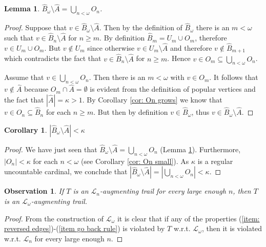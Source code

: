 \documentclass[12pt,a4paper]{amsart}
\theoremstyle{plain}
\newtheorem{corollary}[theorem]{Corollary}
\newtheorem{lemma}[theorem]{Lemma}
\newtheorem{observation}[theorem]{Observation}
\theoremstyle{definition}
\begin{document}
\begin{lemma}\label{lem: B hat minus A hat}
$ \widehat{B}_\omega\setminus \widehat{A}=\bigcup_{n<\omega}O_n $.
\end{lemma}
\begin{proof}
Suppose that $ v\in  \widehat{B}_\omega\setminus \widehat{A}$. Then by the definition of $ \widehat{B}_\omega $  there 
is an $m<\omega $ such that $ 
v \in 
\widehat{B}_n\setminus 
\widehat{A} $ for $ n\geq m $. By definition $  \widehat{B}_m= U_m\cup O_m
 $,  therefore $ v\in U_m\cup O_m $. But $ v \notin U_m $ since otherwise $ v\in U_m\setminus \widehat{A} $ and 
 therefore $ 
v\notin \widehat{B}_{m+1} $ which contradicts the fact that $ v \in 
\widehat{B}_n\setminus 
\widehat{A} $ for $ n\geq m $. Hence $ v \in O_m\subseteq  \bigcup_{n<\omega}O_n$.

Assume that $ v\in \bigcup_{n<\omega}O_n $. Then there is an $ m<\omega $ with $ v\in O_m $. It follows that $ v\notin \widehat{A} $ because 
$ O_m\cap \widehat{A}=\emptyset $ is evident from the definition of popular vertices and the fact that $ \left|\widehat{A}\right|=\kappa>1 $. By 
Corollary \ref{cor: On grows} we know that $ v\in O_n 
\subseteq 
\widehat{B}_n $ 
for each $ n \geq m $. But then by definition $ v \in \widehat{B}_{\omega} $, thus $ v\in \widehat{B}_\omega\setminus \widehat{A} $.
\end{proof}
\begin{corollary}\label{cor: B hat minus A hat omega small}
$ \left|\widehat{B}_\omega\setminus \widehat{A}\right|<\kappa $
\end{corollary}
\begin{proof}
We have just seen that $ \widehat{B}_\omega\setminus 
\widehat{A}=\bigcup_{n<\omega}O_n $ (Lemma \ref{lem: B hat minus A hat}). Furthermore,   $ \left|O_n\right|<\kappa $ 
for each $ 
n<\omega 
$ (see Corollary \ref{cor: On small}). As $ 
\kappa $ is a 
regular uncountable cardinal, we conclude that $  \left|\widehat{B}_\omega\setminus 
\widehat{A}\right|=\left|\bigcup_{n<\omega}O_n\right|<\kappa $.
\end{proof}
\begin{observation}\label{obs: augmenting at the end}
If $ T $ is an $ \mathcal{L}_n $-augmenting trail for every large enough $ n $, then $ T $ is an $ \mathcal{L}_\omega 
$-augmenting trail.
\end{observation}
\begin{proof}
From the construction of $ \mathcal{L}_\omega $ it is clear that if  any of the properties (\ref{item: reversed edges})-(\ref{item go back rule}) is 
violated by $ T $ w.r.t. $ \mathcal{L}_\omega $, then it is violated w.r.t. $ \mathcal{L}_n $ for every large enough $ n $. 
\end{proof}
\end{document}
